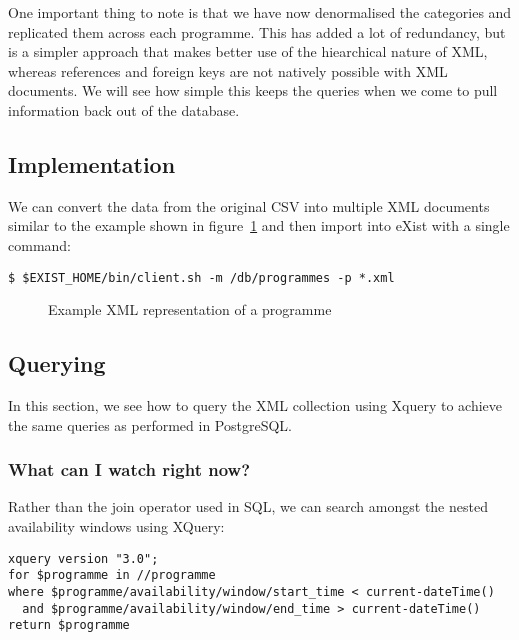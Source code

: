 \documentclass[11pt,a4paper]{article}
\begin{document}
One important thing to note is that we have now denormalised the
categories and replicated them across each programme. This has
added a lot of redundancy, but is a simpler approach that makes better
use of the hiearchical nature of XML, whereas references and foreign
keys are not natively possible with XML documents. We will see how
simple this keeps the queries when we come to pull information back
out of the database.

\subsection{Implementation}

We can convert the data from the original CSV into multiple XML documents
similar to the example shown in figure~\ref{fig:xml-example} and then import
into eXist with a single command:

\begin{lstlisting}
$ $EXIST_HOME/bin/client.sh -m /db/programmes -p *.xml
\end{lstlisting}

\begin{figure}[p]
  
  \caption{Example XML representation of a programme}
  \label{fig:xml-example}
\end{figure}

\subsection{Querying}

In this section, we see how to query the XML collection using Xquery to
achieve the same queries as performed in PostgreSQL.

\subsubsection{What can I watch right now?}

Rather than the join operator used in SQL, we can search amongst
the nested availability windows using XQuery:

\begin{lstlisting}
xquery version "3.0";
for $programme in //programme
where $programme/availability/window/start_time < current-dateTime()
  and $programme/availability/window/end_time > current-dateTime()
return $programme
\end{lstlisting}
\end{document}
